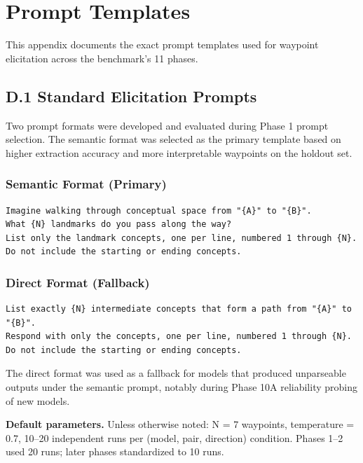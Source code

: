 \section{Prompt Templates}\label{appendix-d-prompt-templates}

This appendix documents the exact prompt templates used for waypoint elicitation across the benchmark's 11 phases.

\subsection{D.1 Standard Elicitation Prompts}\label{d.1-standard-elicitation-prompts}

Two prompt formats were developed and evaluated during Phase 1 prompt selection. The semantic format was selected as the primary template based on higher extraction accuracy and more interpretable waypoints on the holdout set.

\subsubsection{Semantic Format (Primary)}\label{semantic-format-primary}

\begin{verbatim}
Imagine walking through conceptual space from "{A}" to "{B}".
What {N} landmarks do you pass along the way?
List only the landmark concepts, one per line, numbered 1 through {N}.
Do not include the starting or ending concepts.
\end{verbatim}

\subsubsection{Direct Format (Fallback)}\label{direct-format-fallback}

\begin{verbatim}
List exactly {N} intermediate concepts that form a path from "{A}" to "{B}".
Respond with only the concepts, one per line, numbered 1 through {N}.
Do not include the starting or ending concepts.
\end{verbatim}

The direct format was used as a fallback for models that produced unparseable outputs under the semantic prompt, notably during Phase 10A reliability probing of new models.

\textbf{Default parameters.} Unless otherwise noted: N = 7 waypoints, temperature = 0.7, 10--20 independent runs per (model, pair, direction) condition. Phases 1--2 used 20 runs; later phases standardized to 10 runs.

